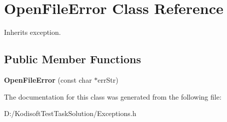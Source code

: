 \hypertarget{class_open_file_error}{\section{Open\+File\+Error Class Reference}
\label{class_open_file_error}
}


Inherits exception.

\subsection*{Public Member Functions}
\begin{DoxyCompactItemize}
\item 
\hypertarget{class_open_file_error_abf16542202710d1d2f5c3381bf028091}{{\bfseries Open\+File\+Error} (const char $\ast$err\+Str)}\label{class_open_file_error_abf16542202710d1d2f5c3381bf028091}

\end{DoxyCompactItemize}


The documentation for this class was generated from the following file\+:\begin{DoxyCompactItemize}
\item 
D\+:/\+Kodisoft\+Test\+Task\+Solution/Exceptions.\+h\end{DoxyCompactItemize}
